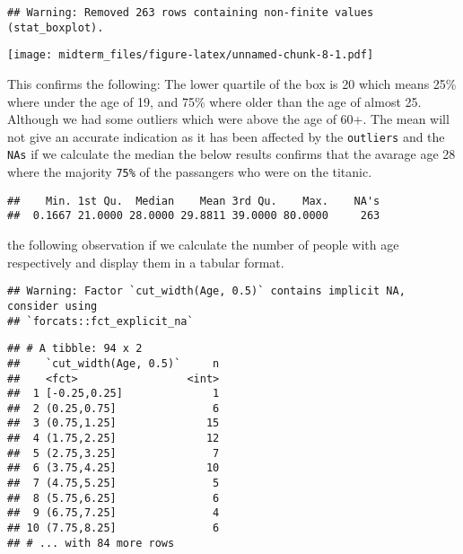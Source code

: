 \documentclass[]{article}
\newenvironment{Shaded}{\begin{snugshade}}{\end{snugshade}}
\newcommand{\FloatTok}[1]{\textcolor[rgb]{0.00,0.00,0.81}{#1}}
\newcommand{\KeywordTok}[1]{\textcolor[rgb]{0.13,0.29,0.53}{\textbf{#1}}}
\newcommand{\NormalTok}[1]{#1}
\newcommand{\OperatorTok}[1]{\textcolor[rgb]{0.81,0.36,0.00}{\textbf{#1}}}
\newcommand{\StringTok}[1]{\textcolor[rgb]{0.31,0.60,0.02}{#1}}
\begin{document}
\begin{verbatim}
## Warning: Removed 263 rows containing non-finite values (stat_boxplot).
\end{verbatim}

\texttt{[image: midterm\_files/figure-latex/unnamed-chunk-8-1.pdf]}

This confirms the following: The lower quartile of the box is 20 which
means 25\% where under the age of 19, and 75\% where older than the age
of almost 25. Although we had some outliers which were above the age of
60+. The mean will not give an accurate indication as it has been
affected by the \texttt{outliers} and the \texttt{NA\textquotesingle{}s}
if we calculate the median the below results confirms that the avarage
age 28 where the majority \texttt{75\%} of the passangers who were on
the titanic.

\begin{Shaded}
\end{Shaded}

\begin{verbatim}
##    Min. 1st Qu.  Median    Mean 3rd Qu.    Max.    NA's 
##  0.1667 21.0000 28.0000 29.8811 39.0000 80.0000     263
\end{verbatim}

the following observation if we calculate the number of people with age
respectively and display them in a tabular format.

\begin{Shaded}
\end{Shaded}

\begin{verbatim}
## Warning: Factor `cut_width(Age, 0.5)` contains implicit NA, consider using
## `forcats::fct_explicit_na`
\end{verbatim}

\begin{verbatim}
## # A tibble: 94 x 2
##    `cut_width(Age, 0.5)`     n
##    <fct>                 <int>
##  1 [-0.25,0.25]              1
##  2 (0.25,0.75]               6
##  3 (0.75,1.25]              15
##  4 (1.75,2.25]              12
##  5 (2.75,3.25]               7
##  6 (3.75,4.25]              10
##  7 (4.75,5.25]               5
##  8 (5.75,6.25]               6
##  9 (6.75,7.25]               4
## 10 (7.75,8.25]               6
## # ... with 84 more rows
\end{verbatim}
\end{document}
